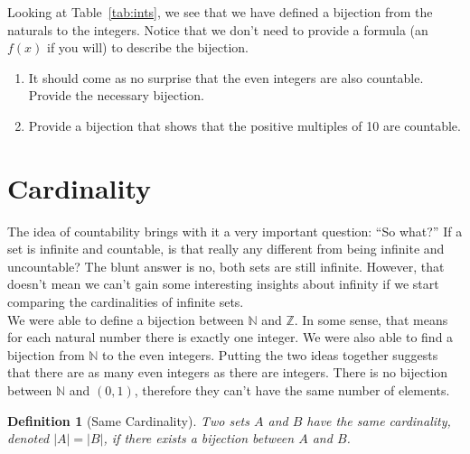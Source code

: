 \documentclass[12 pt]{article}
\newcommand{\Z}{\mathbb{Z}}
\newcommand{\N}{\mathbb{N}}
\theoremstyle{definition}
\theoremstyle{plain}
\theoremstyle{mytheorem}
\theoremstyle{myexample}
\theoremstyle{mydefinition}
\newtheorem{definition}{Definition}
\begin{document}
Looking at Table~\ref{tab:ints}, we see that we have defined a bijection from the naturals to the integers.  Notice that we don't need to provide a formula (an $f(x)$ if you will) to describe the bijection.

\begin{enumerate}[resume]
\item It should come as no surprise that the even integers are also countable.  Provide the necessary bijection.

\vspace{2in}
\item Provide a bijection that shows that the positive multiples of 10 are countable.

\vspace{2in}
\end{enumerate}

\section{Cardinality}

The idea of countability brings with it a very important question: ``So what?''  If a set is infinite and countable, is that really any different from being infinite and uncountable?  The blunt answer is no, both sets are still infinite.  However, that doesn't mean we can't gain some interesting insights about infinity if we start comparing the cardinalities of infinite sets.\\

We were able to define a bijection between $\N$ and $\Z$.  In some sense, that means for each natural number there is exactly one integer.  We were also able to find a bijection from $\N$ to the even integers.  Putting the two ideas together suggests that there are as many even integers as there are integers.  There is no bijection between $\N$ and $(0,1)$, therefore they can't have the same number of elements.\\

\begin{definition}[Same Cardinality]  Two sets $A$ and $B$ have the \textit{same cardinality}, denoted $|A|=|B|$, if there exists a bijection between $A$ and $B$.
\end{definition}
\end{document}
